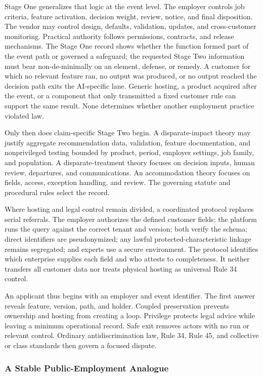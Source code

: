 Stage One generalizes that logic at the event level. The employer controls job criteria, feature activation, decision weight, review, notice, and final disposition. The vendor may control design, defaults, validation, updates, and cross-customer monitoring. Practical authority follows permissions, contracts, and release mechanisms. The Stage One record shows whether the function formed part of the event path or governed a safeguard; the requested Stage Two information must bear non-de-minimally on an element, defense, or remedy. A customer for which no relevant feature ran, no output was produced, or no output reached the decision path exits the AI-specific lane. Generic hosting, a product acquired after the event, or a component that only transmitted a fixed customer rule can support the same result. None determines whether another employment practice violated law.

Only then does claim-specific Stage Two begin. A disparate-impact theory may justify aggregate recommendation data, validation, feature documentation, and nonprivileged testing bounded by product, period, employer settings, job family, and population. A disparate-treatment theory focuses on decision inputs, human review, departures, and communications. An accommodation theory focuses on fields, access, exception handling, and review. The governing statute and procedural rules select the record.

Where hosting and legal control remain divided, a coordinated protocol replaces serial referrals. The employer authorizes the defined customer fields; the platform runs the query against the correct tenant and version; both verify the schema; direct identifiers are pseudonymized; any lawful protected-characteristic linkage remains segregated; and experts use a secure environment. The protocol identifies which enterprise supplies each field and who attests to completeness. It neither transfers all customer data nor treats physical hosting as universal Rule 34 control.

An applicant thus begins with an employer and event identifier. The first answer reveals feature, version, path, and holder. Coupled preservation prevents ownership and hosting from creating a loop. Privilege protects legal advice while leaving a minimum operational record. Safe exit removes actors with no run or relevant control. Ordinary antidiscrimination law, Rule 34, Rule 45, and collective or class standards then govern a focused dispute.

\subsubsection{A Stable Public-Employment Analogue}

